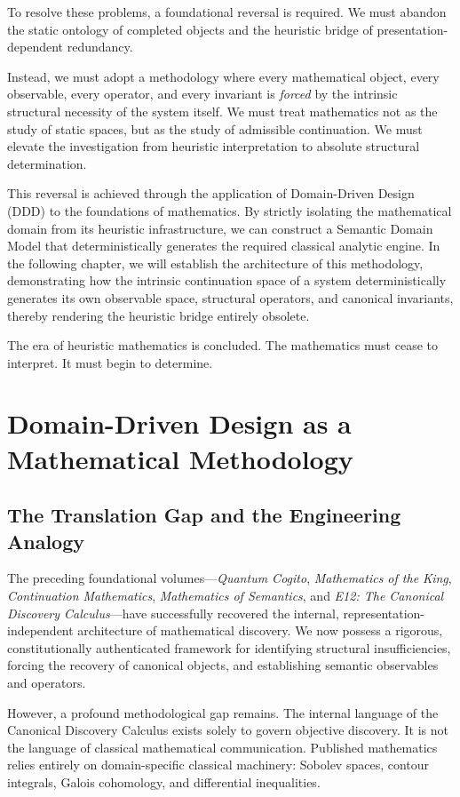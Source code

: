 \documentclass[12pt,openany]{extbook}
\theoremstyle{plain}
\theoremstyle{definition}
\begin{document}
To resolve these problems, a foundational reversal is required. We must abandon the static ontology of completed objects and the heuristic bridge of presentation-dependent redundancy. 

Instead, we must adopt a methodology where every mathematical object, every observable, every operator, and every invariant is \emph{forced} by the intrinsic structural necessity of the system itself. We must treat mathematics not as the study of static spaces, but as the study of admissible continuation. We must elevate the investigation from heuristic interpretation to absolute structural determination.

This reversal is achieved through the application of Domain-Driven Design (DDD) to the foundations of mathematics. By strictly isolating the mathematical domain from its heuristic infrastructure, we can construct a Semantic Domain Model that deterministically generates the required classical analytic engine. In the following chapter, we will establish the architecture of this methodology, demonstrating how the intrinsic continuation space of a system deterministically generates its own observable space, structural operators, and canonical invariants, thereby rendering the heuristic bridge entirely obsolete.

The era of heuristic mathematics is concluded. The mathematics must cease to interpret. It must begin to determine.

\chapter{Domain-Driven Design as a Mathematical Methodology}

\section{The Translation Gap and the Engineering Analogy}

The preceding foundational volumes---\emph{Quantum Cogito}, \emph{Mathematics of the King}, \emph{Continuation Mathematics}, \emph{Mathematics of Semantics}, and \emph{E12: The Canonical Discovery Calculus}---have successfully recovered the internal, representation-independent architecture of mathematical discovery. We now possess a rigorous, constitutionally authenticated framework for identifying structural insufficiencies, forcing the recovery of canonical objects, and establishing semantic observables and operators. 

However, a profound methodological gap remains. The internal language of the Canonical Discovery Calculus exists solely to govern objective discovery. It is not the language of classical mathematical communication. Published mathematics relies entirely on domain-specific classical machinery: Sobolev spaces, contour integrals, Galois cohomology, and differential inequalities. 
\end{document}
